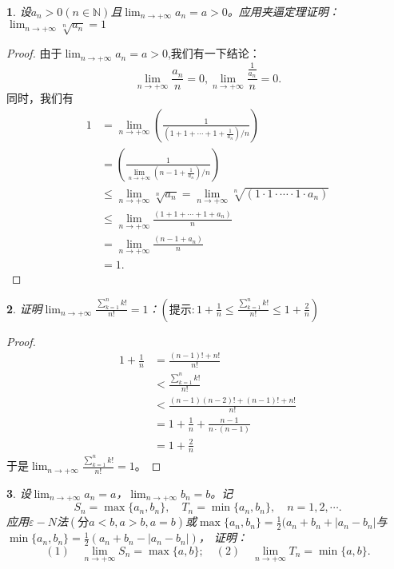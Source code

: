 \documentclass[utf8]{book}
\newtheorem{example}{}[section]             %
\begin{document}
\begin{example}
设$a_n > 0 (n\in\mathbb{N})$且$\displaystyle \lim_{n\to +\infty}a_n = a > 0$。应用夹逼定理证明：$\displaystyle \lim_{n\to +\infty}\sqrt[n]{a_n} = 1$
\end{example}
\begin{proof}
由于$\displaystyle \lim_{n\to +\infty}a_n = a > 0$,我们有一下结论：
$$\displaystyle \lim_{n\to +\infty}\frac{a_n}{n} = 0, \displaystyle \lim_{n\to +\infty}\frac{\frac{1}{a_n}}{n} = 0.$$
同时，我们有
\begin{equation*}
\begin{split}
1&=\lim_{n\to +\infty}\left(\frac{1}{\left(1 + 1 +\cdots+1+\frac{1}{a_n}\right)/n}\right)\\
&=\left(\frac{1}{\displaystyle\lim_{n\to +\infty}\left(n- 1 +\frac{1}{a_n}\right)/n}\right)\\
&\leq \lim_{n\to +\infty}\sqrt[n]{a_n} =\lim_{n\to +\infty}\sqrt[n]{\left(1\cdot 1\cdot \cdots \cdot 1\cdot a_n\right)}\\
&\leq \lim_{n\to +\infty}\frac{\left(1 + 1 +\cdots+1+a_n\right)}{n} \\
&=\lim_{n\to +\infty}\frac{\left(n-1+a_n\right)}{n}\\
&=1.
\end{split}
\end{equation*}
\end{proof}
\begin{example}
证明$\displaystyle \lim_{n\to +\infty}\frac{\displaystyle\sum_{k=1}^nk!}{n!} = 1$：$\left(\text{提示}: 1+\frac{1}{n}\leq\frac{\displaystyle\sum_{k=1}^nk!}{n!}\leq 1+ \frac{2}{n}\right)$
\end{example}
\begin{proof}
\begin{equation*}
\begin{split}
1+\frac{1}{n} &= \frac{(n-1)!+n!}{n!} \\&< \frac{\displaystyle\sum_{k=1}^nk!}{n!} \\&< \frac{(n-1)(n-2)!+(n-1)!+n!}{n!} \\
&= 1 + \frac{1}{n} + \frac{n-1}{n\cdot(n-1)} \\&= 1 +\frac{2}{n}
\end{split}
\end{equation*}
于是$\displaystyle \lim_{n\to +\infty}\frac{\displaystyle\sum_{k=1}^nk!}{n!} = 1$。
\end{proof}
\begin{example}
设$\displaystyle \lim_{n\to +\infty}a_n = a$，$\displaystyle \lim_{n\to +\infty}b_n = b$。记
$$S_n=\max\{a_n, b_n\}, \quad T_n = \min\{a_n, b_n\}, \quad n = 1,2,\cdots.$$
应用$\varepsilon-N$法$(\text{分} a < b, a>b, a=b)$或$\max\{a_n,b_n\} = \frac{1}{2}(a_n+b_n+|a_n-b_n|$与$\min\{a_n,b_n\} = \frac{1}{2}(a_n+b_n-|a_n-b_n|)$，
证明：
$$(1)\quad \displaystyle \lim_{n\to +\infty}S_n = \max\{a, b\}; \quad (2)\quad \displaystyle \lim_{n\to +\infty}T_n = \min\{a, b\}.$$
\end{example}
\end{document}
